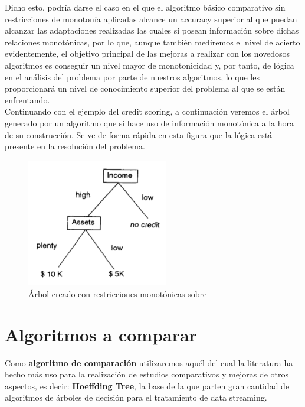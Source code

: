 Dicho esto, podría darse el caso en el que el algoritmo básico comparativo sin restricciones de monotonía aplicadas alcance un accuracy superior al que puedan alcanzar las adaptaciones realizadas las cuales si posean información sobre dichas relaciones monotónicas, por lo que, aunque también mediremos el nivel de acierto evidentemente, el objetivo principal de las mejoras a realizar con los novedosos algoritmos es conseguir un nivel mayor de monotonicidad y, por tanto, de lógica en el análisis del problema por parte de nuestros algoritmos, lo que les proporcionará un nivel de conocimiento superior del problema al que se están enfrentando.\\

Continuando con el ejemplo del credit scoring, a continuación veremos el árbol generado por un algoritmo que sí hace uso de información monotónica a la hora de su construcción. Se ve de forma rápida en esta figura que la lógica está presente en la resolución del problema.

\begin{figure}[H]
	\centering
	\includegraphics[width=0.55\textwidth]{imagenes/arbolBueno} 
	\caption{Árbol creado con restricciones monotónicas sobre\cite{ref14}}
\end{figure}

\section{Algoritmos a comparar}

Como \textbf{algoritmo de comparación} utilizaremos aquél del cual la literatura ha hecho más uso para la realización de estudios comparativos y mejoras de otros aspectos, es decir: \textbf{Hoeffding Tree}, la base de la que parten gran cantidad de algoritmos de árboles de decisión para el tratamiento de data streaming.\\

